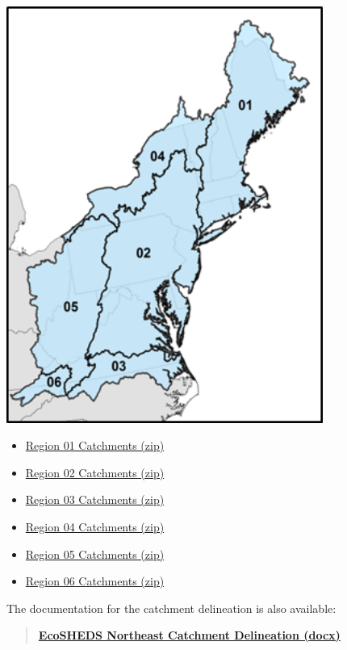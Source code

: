 \documentclass[
]{book}
\providecommand{\tightlist}{%
  \setlength{\itemsep}{0pt}\setlength{\parskip}{0pt}}
\begin{document}
\includegraphics[width=4.08in]{img/hydrologic-regions}

\begin{itemize}
\tightlist
\item
  \href{http://ecosheds.org/assets/nhdhrd/v2/spatial_01.zip}{Region 01 Catchments (zip)}
\item
  \href{http://ecosheds.org/assets/nhdhrd/v2/spatial_02.zip}{Region 02 Catchments (zip)}
\item
  \href{http://ecosheds.org/assets/nhdhrd/v2/spatial_03.zip}{Region 03 Catchments (zip)}
\item
  \href{http://ecosheds.org/assets/nhdhrd/v2/spatial_04.zip}{Region 04 Catchments (zip)}
\item
  \href{http://ecosheds.org/assets/nhdhrd/v2/spatial_05.zip}{Region 05 Catchments (zip)}
\item
  \href{http://ecosheds.org/assets/nhdhrd/v2/spatial_06.zip}{Region 06 Catchments (zip)}
\end{itemize}

The documentation for the catchment delineation is also available:

\begin{quote}
\textbf{\href{http://ecosheds.org/assets/nhdhrd/v2/NHDHRDV2_Documentation.docx}{EcoSHEDS Northeast Catchment Delineation (docx)}}
\end{quote}
\end{document}
